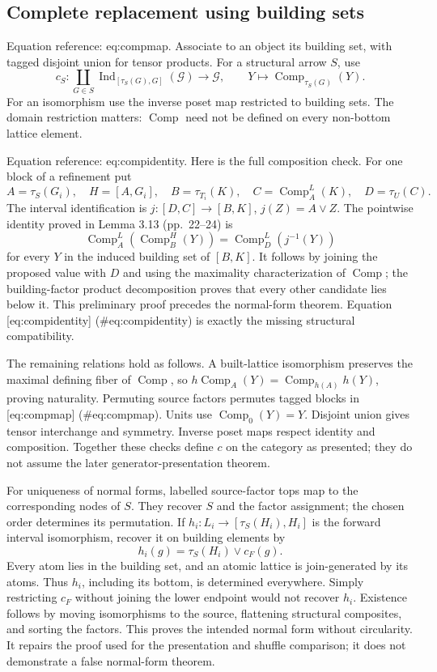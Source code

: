 \documentclass[10pt]{article}
\begin{document}
\subsection*{Complete replacement using building sets}
Equation reference: eq:compmap. Associate to an object its building set, with tagged disjoint union for tensor products. For a structural arrow \(S\), use \[
 c_S:\coprod_{G\in S}\operatorname{Ind}_{[\tau_S(G),G]}(\mathcal G)\longrightarrow\mathcal G,
 \qquad Y\longmapsto\operatorname{Comp}_{\tau_S(G)}(Y).\] For an isomorphism use the inverse poset map restricted to building sets. The domain restriction matters: \(\operatorname{Comp}\) need not be defined on every non-bottom lattice element.\par
Equation reference: eq:compidentity. Here is the full composition check. For one block of a refinement put \[A=\tau_S(G_i),\quad H=[A,G_i],\quad
 B=\tau_{T_i}(K),\quad C=\operatorname{Comp}_A^L(K),\quad D=\tau_U(C).\] The interval identification is \(j:[D,C]\to[B,K]\), \(j(Z)=A\vee Z\). The pointwise identity proved in Lemma 3.13 (pp. 22–24) is \[
 \operatorname{Comp}_A^L\!\left(\operatorname{Comp}_B^H(Y)\right)
   =\operatorname{Comp}_D^L\!\left(j^{-1}(Y)\right)\] for every \(Y\) in the induced building set of \([B,K]\). It follows by joining the proposed value with \(D\) and using the maximality characterization of \(\operatorname{Comp}\); the building-factor product decomposition proves that every other candidate lies below it. This preliminary proof precedes the normal-form theorem. Equation [eq:compidentity] (\#eq:compidentity) is exactly the missing structural compatibility.\par
The remaining relations hold as follows. A built-lattice isomorphism preserves the maximal defining fiber of \(\operatorname{Comp}\), so \(h\operatorname{Comp}_A(Y)=\operatorname{Comp}_{h(A)}h(Y)\), proving naturality. Permuting source factors permutes tagged blocks in [eq:compmap] (\#eq:compmap). Units use \(\operatorname{Comp}_0(Y)=Y\). Disjoint union gives tensor interchange and symmetry. Inverse poset maps respect identity and composition. Together these checks define \(c\) on the category as presented; they do not assume the later generator-presentation theorem.\par
For uniqueness of normal forms, labelled source-factor tops map to the corresponding nodes of \(S\). They recover \(S\) and the factor assignment; the chosen order determines its permutation. If \(h_i:L_i\to[\tau_S(H_i),H_i]\) is the forward interval isomorphism, recover it on building elements by \[h_i(g)=\tau_S(H_i)\vee c_F(g).\] Every atom lies in the building set, and an atomic lattice is join-generated by its atoms. Thus \(h_i\), including its bottom, is determined everywhere. Simply restricting \(c_F\) without joining the lower endpoint would not recover \(h_i\). Existence follows by moving isomorphisms to the source, flattening structural composites, and sorting the factors. This proves the intended normal form without circularity. It repairs the proof used for the presentation and shuffle comparison; it does not demonstrate a false normal-form theorem.\par
\end{document}
